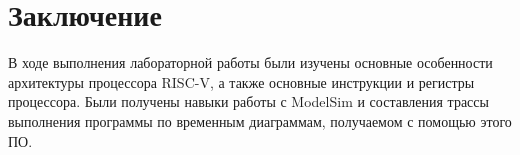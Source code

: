 \chapter{Заключение}

В ходе выполнения лабораторной работы были изучены основные 
осо\-бенности архитектуры процессора RISC-V, а также основные 
инструкции и регистры процессора. Были получены навыки работы
с ModelSim и состав\-ления трассы выполнения программы по временным
диаграммам, получа\-емом с помощью этого ПО.
